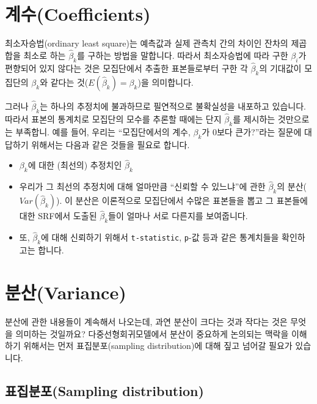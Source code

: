 \documentclass[
]{book}
\begin{document}
\hypertarget{uxacc4uxc218coefficients}{%
\section{계수(Coefficients)}\label{uxacc4uxc218coefficients}}

최소자승법(ordinary least square)는 예측값과 실제 관측치 간의 차이인 잔차의 제곱합을 최소로 하는 \(\hat{\beta}_k\)를 구하는 방법을 말합니다. 따라서 최소자승법에 따라 구한 \(\beta_i\)가 편향되어 있지 않다는 것은 모집단에서 추출한 표본들로부터 구한 각 \(\hat{\beta}_k\)의 기대값이 모집단의 \(\beta_k\)와 같다는 것(\(E(\hat{\beta}_k)=\beta_k\))을 의미합니다.

그러나 \(\hat{\beta}_k\)는 하나의 추정치에 불과하므로 필연적으로 불확실성을 내포하고 있습니다. 따라서 표본의 통계치로 모집단의 모수를 추론할 때에는 단지 \(\hat{\beta}_k\)를 제시하는 것만으로는 부족합니. 예를 들어, 우리는 ``모집단에서의 계수, \(\beta_k\)가 0보다 큰가?''라는 질문에 대답하기 위해서는 다음과 같은 것들을 필요로 합니다.

\begin{itemize}
\item
  \(\beta_k\)에 대한 (최선의) 추정치인 \(\hat{\beta}_k\)
\item
  우리가 그 최선의 추정치에 대해 얼마만큼 ``신뢰할 수 있느냐''에 관한 \(\hat{\beta}_k\)의 분산(\(Var(\hat{\beta}_k)\)). 이 분산은 이론적으로 모집단에서 수많은 표본들을 뽑고 그 표본들에 대한 SRF에서 도출된 \(\hat{\beta}_k\)들이 얼마나 서로 다른지를 보여줍니다.
\item
  또, \(\hat{\beta}_k\)에 대해 신뢰하기 위해서 \texttt{t-statistic}, \texttt{p}-값 등과 같은 통계치들을 확인하고는 합니다.
\end{itemize}

\hypertarget{uxbd84uxc0b0variance}{%
\section{분산(Variance)}\label{uxbd84uxc0b0variance}}

분산에 관한 내용들이 계속해서 나오는데, 과연 분산이 크다는 것과 작다는 것은 무엇을 의미하는 것일까요? 다중선형회귀모델에서 분산이 중요하게 논의되는 맥락을 이해하기 위해서는 먼저 표집분포(sampling distribution)에 대해 짚고 넘어갈 필요가 있습니다.

\hypertarget{uxd45cuxc9d1uxbd84uxd3ecsampling-distribution}{%
\subsection{표집분포(Sampling distribution)}\label{uxd45cuxc9d1uxbd84uxd3ecsampling-distribution}}
\end{document}
